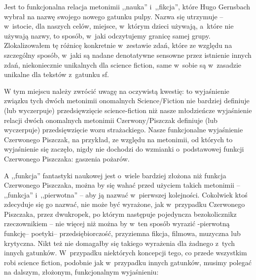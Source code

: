 \documentclass[oneside,polish,11pt,rmheadings]{mwbk}
\begin{document}
Jest to funkcjonalna relacja metonimii ,,nauka'' i~,,fikcja'', które Hugo Gernsbach wybrał na nazwę swojego nowego gatunku pulpy. Nazwa się utrzymuje -- w~istocie, dla naszych celów, miejsce, w~którym dzieci używają, a~które nie używają nazwy, to sposób, w~jaki odczytujemy granicę samej grupy. Zlokalizowałem tę różnicę konkretnie w~zestawie zdań, które ze względu na szczególny sposób, w~jaki są nadane denotatywne sensowne przez istnienie innych zdań, niekoniecznie unikalnych dla science fiction, same w~sobie są w~zasadzie unikalne dla tekstów z~gatunku sf. 

W tym miejscu należy zwrócić uwagę na oczywistą kwestię: to wyjaśnienie związku tych dwóch metonimii onomalnych Science/Fiction nie bardziej definiuje (lub wyczerpuje) przedsięwzięcie science-fiction niż nasze młodzieńcze wyjaśnienie relacji dwóch onomalnych metonimii Czerwony/Piszczak definiuje (lub wyczerpuje) przedsięwzięcie wozu strażackiego. Nasze funkcjonalne wyjaśnienie Czerwonego Piszczak, na przykład, ze względu na metonimii, od których to wyjaśnienie się zaczęło, nigdy nie dochodzi do wzmianki o~podstawowej funkcji Czerwonego Piszczaka: gaszenia pożarów. 

A ,,funkcja'' fantastyki naukowej jest o~wiele bardziej złożona niż funkcja Czerwonego Piszczaka, można by się wahać przed użyciem takich metonimii -- ,,funkcja'' i~,,pierwotna'' -- aby ją nazwać w~pierwszej kolejności. Cokolwiek ktoś zdecyduje się go nazwać, nie może być wyrażone, jak w~przypadku Czerwonego Piszczaka, przez dwukropek, po którym następuje pojedyncza bezokolicznik\dywiz z \dywiz rzeczownikiem -- nie więcej niż można by w~ten sposób wyrazić -pierwotną funkcję-- poetyki-- przedsiębiorczość, przyziemna fikcja, filmowa, muzyczna lub krytyczna. Nikt też nie domagałby się takiego wyrażenia dla żadnego z~tych innych gatunków. W~przypadku niektórych koncepcji tego, co przede wszystkim robi science fiction, podobnie jak w~przypadku innych gatunków, musimy polegać na dalszym, złożonym, funkcjonalnym wyjaśnieniu: 
\end{document}
